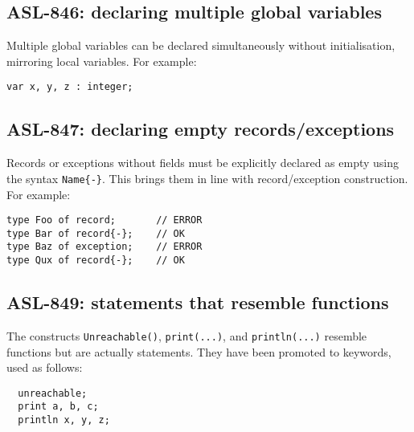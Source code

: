 \subsection{ASL-846: declaring multiple global variables}

Multiple global variables can be declared simultaneously without initialisation, mirroring local variables.
For example:
\begin{lstlisting}
var x, y, z : integer;
\end{lstlisting}


\subsection{ASL-847: declaring empty records/exceptions}

Records or exceptions without fields must be explicitly declared as empty using the syntax \texttt{Name\{-\}}.
This brings them in line with record/exception construction.
For example:

\begin{lstlisting}
type Foo of record;       // ERROR
type Bar of record{-};    // OK
type Baz of exception;    // ERROR
type Qux of record{-};    // OK
\end{lstlisting}


\subsection{ASL-849: statements that resemble functions}

The constructs \texttt{Unreachable()}, \texttt{print(...)}, and \texttt{println(...)} resemble functions but are actually statements.
They have been promoted to keywords, used as follows:
\begin{lstlisting}
  unreachable;
  print a, b, c;
  println x, y, z;
\end{lstlisting}

